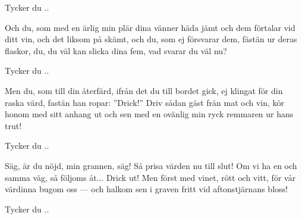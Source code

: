 \beginchorus						%
Tycker du ..
\endchorus

\beginverse*
Och du, som med en ärlig min
plär dina vänner häda jämt
och dem förtalar vid ditt vin,
och det liksom på skämt,
och du, som ej försvarar dem,
fästän ur deras flaskor, du,
du väl kan slicka dina fem,
vad svarar du väl nu?
\endverse

\beginchorus						%
Tycker du ..
\endchorus

\beginverse*
Men du, som till din återfärd,
ifrån det du till bordet gick,
ej klingat för din raska värd,
fastän han ropar: ''Drick!''
Driv sådan gäst från mat och vin,
kör honom med sitt anhang ut
och sen med en ovänlig min
ryck remmaren ur hans trut!
\endverse

\beginchorus						%
Tycker du ..
\endchorus

\beginverse*
Säg, är du nöjd, min grannen, säg!
Så prisa värden nu till slut!
Om vi ha en och samma väg,
så följoms åt... Drick ut!
Men först med vinet, rött och vitt,
för vår värdinna bugom oss —
och halkom sen i graven fritt
vid aftonstjärnans bloss!
\endverse

\beginchorus						%
Tycker du ..
\endchorus

\endsong							%